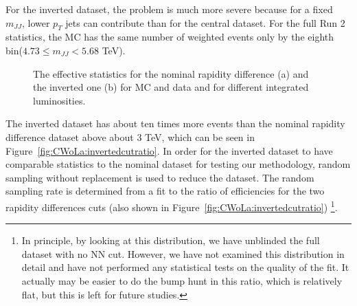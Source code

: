 For the inverted dataset, the problem is much more severe because for a fixed $m_{JJ}$, lower $p_T$ jets can contribute than for the central dataset.
For the full Run 2 statistics, the MC has the same number of weighted events only by the eighth bin($4.73 \le m_{JJ} < 5.68$ TeV).

\begin{figure}[h!]
\centering
{}
\caption{The effective statistics for the nominal rapidity difference (a) and the inverted one (b) for MC and data and for different integrated luminosities.}
\label{fig:CWoLa:effectivestats}
\end{figure}

The inverted dataset has about ten times more events than the nominal rapidity difference dataset above about 3 TeV, which can be seen in Figure~\ref{fig:CWoLa:invertedcutratio}.
In order for the inverted dataset to have comparable statistics to the nominal dataset for testing our methodology, random sampling without replacement is used to reduce the dataset.
The random sampling rate is determined from a fit to the ratio of efficiencies for the two rapidity differences cuts (also shown in Figure~\ref{fig:CWoLa:invertedcutratio})
\footnote{In principle, by looking at this distribution, we have unblinded the full dataset with no NN cut.  However, we have not examined this distribution in detail and have not performed any statistical tests on the quality of the fit.  It actually may be easier to do the bump hunt in this ratio, which is relatively flat, but this is left for future studies.}.

